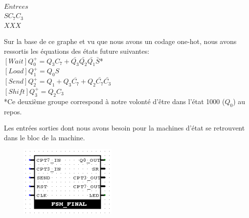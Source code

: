 \documentclass[a4paper]{article} %
\begin{document}
\begin{tcolorbox}[colframe=Monokaimagenta,colback=white, breakable, enhanced]
\begin{center}
 \\
    $Entrees$ \\ $SC_7C_3$ \\$ XXX$
\end{center}

Sur la base de ce graphe et vu que nous avons un codage one-hot, nous avons ressortis les équations des états future suivantes:\\
$[Wait]  Q_0^+ = Q_3C_7 + \bar{Q_3}\bar{Q_2}\bar{Q_1}\bar{S}$* \\
$[Load ] Q_1^+ = Q_0S $\\
$[Send]  Q_2^+ = Q_1 + Q_3\overline{C_7} + Q_2\bar{C_7}\bar{C_3}$\\
$[Shift] Q_3^+ = Q_2C_3$\\

*Ce deuxième groupe correspond à notre volonté d'être dans l'état 1000 ($Q_0$) au repos.

Les entrées sorties dont nous avons besoin pour la machines d'état se retrouvent dans le bloc de la machine.
\begin{figure}[H]
	\centering
	\includegraphics[scale = 0.8]{src/bloc_FSM}
	\label{fig:bloc_FSM}
\end{figure}


\end{tcolorbox}
\end{document}
